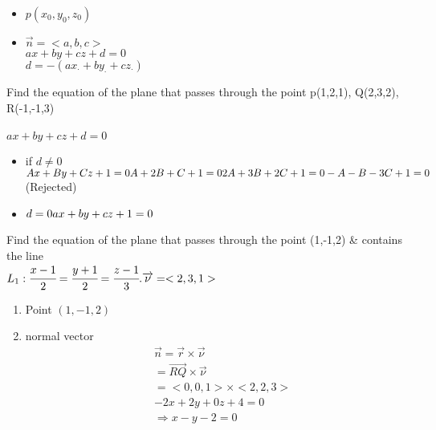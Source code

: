  \noindent{\color{smalt(darkpowderblue)}\rule{\linewidth}{.2mm}}
 {{}}
\begin{itemize}
    \item $ p(x_0 , y_0 , z_0)$
    \item $\overrightarrow{n} = <a,b,c>$\\
$ax+by+cz+d = 0$\\
$d=-(ax_\cdot + by_\cdot +cz_\cdot)$
\end{itemize}
\noindent{\color{smalt(darkpowderblue)}\rule{\linewidth}{.2mm}}
\begin{example}
Find the equation of the plane that passes through the point 
p(1,2,1), Q(2,3,2), R(-1,-1,3)\\
{{}} \\
$ax+by+cz+d=0 $ 
\begin{itemize}
    \item if $d\neq 0 $ \\ $Ax+By+Cz+1=0 \\ 
    A+2B+C+1=0 \\ 2A+3B+2C+1=0 \\ -A-B-3C+1=0 $ \hspace{1cm} (Rejected)
    \item $d=0 \\ ax+by+cz+1=0$
\end{itemize}
\end{example}
\noindent{\color{smalt(darkpowderblue)}\rule{\linewidth}{.2mm}}
\begin{example}
Find the equation of the plane that passes through the point (1,-1,2) \& contains the line \\
$L_{1} : \cfrac{x-1}{2} = \cfrac{y+1}{2} = \cfrac{z-1}{3}. \overrightarrow{\nu} = <2,3,1>$\\
{{}}
\begin{enumerate}
    \item  Point $(1,-1,2)$
    \item  normal vector 
    \begin{align*}
&\overrightarrow{n} = \overrightarrow{r} \times \overrightarrow{\nu}\\
&=\overrightarrow{RQ} \times \overrightarrow{\nu}\\
&=<0,0,1> \times <2,2,3>\\
&-2x+2y+0z+4=0\\
&\Rightarrow x-y-2=0
\end{align*}
\end{enumerate}
\end{example} 
